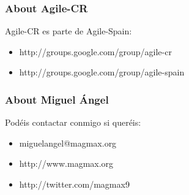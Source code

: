  \begin{frame}
  \frametitle{About Agile-CR}

  Agile-CR es parte de Agile-Spain:

  \begin{itemize}
   \item http://groups.google.com/group/agile-cr
   \item http://groups.google.com/group/agile-spain
  \end{itemize}
 \end{frame}

 \begin{frame}
  \frametitle{About Miguel Ángel}

  Podéis contactar conmigo si queréis:

  \begin{itemize}
   \item miguelangel@magmax.org
   \item http://www.magmax.org
   \item http://twitter.com/magmax9
  \end{itemize}
 \end{frame}
